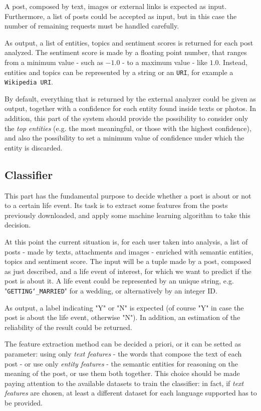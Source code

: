 A post, composed by text, images or external links is expected as input. Furthermore, a list of posts could be accepted as input, but in this case the number of remaining requests must be handled carefully.

As output, a list of entities, topics and sentiment scores is returned for each post analyzed. The sentiment score is made by a floating point number, that ranges from a minimum value - such as $ -1.0 $ - to a maximum value - like $ 1.0 $. Instead, entities and topics can be represented by a string or an \texttt{URI}, for example a \texttt{Wikipedia URI}.

By default, everything that is returned by the external analyzer could be given as output, together with a confidence for each entity found inside texts or photos. In addition, this part of the system should provide the possibility to consider only the \textit{top entities} (e.g. the most meaningful, or those with the highest confidence), and also the possibility to set a minimum value of confidence under which the entity is discarded.

\subsection{Classifier}
This part has the fundamental purpose to decide whether a post is about or not to a certain life event. Its task is to extract some features from the posts previously downloaded, and apply some machine learning algorithm to take this decision.

At this point the current situation is, for each user taken into analysis, a list of posts - made by texts, attachments and images - enriched with semantic entities, topics and sentiment score. The input will be a tuple made by a post, composed as just described, and a life event of interest, for which we want to predict if the post is about it. A life event could be represented by an unique string, e.g. "\texttt{GETTING\char`_MARRIED}" for a wedding, or alternatively by an integer ID.

As output, a label indicating "Y" or "N" is expected (of course "Y" in case the post is about the life event, otherwise "N"). In addition, an estimation of the reliability of the result could be returned.

The feature extraction method can be decided a priori, or it can be setted as parameter: using only \textit{text features} - the words that compose the text of each post - or use only \textit{entity features} - the semantic entities for reasoning on the meaning of the post, or use them both together. This choice should be made paying attention to the available datasets to train the classifier: in fact, if \textit{text features} are chosen, at least a different dataset for each language supported has to be provided.

